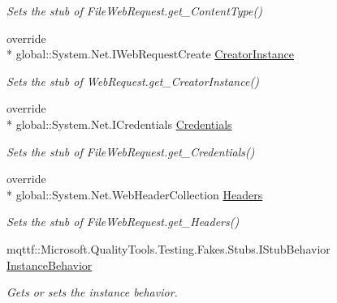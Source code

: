 \begin{DoxyCompactItemize}
\begin{DoxyCompactList}\small\item\em Sets the stub of File\-Web\-Request.\-get\-\_\-\-Content\-Type()\end{DoxyCompactList}\item 
override \\*
global\-::\-System.\-Net.\-I\-Web\-Request\-Create \hyperlink{class_system_1_1_net_1_1_fakes_1_1_stub_file_web_request_adf40d6afafbe0890830bbf7edb3ef572}{Creator\-Instance}
\begin{DoxyCompactList}\small\item\em Sets the stub of Web\-Request.\-get\-\_\-\-Creator\-Instance()\end{DoxyCompactList}\item 
override \\*
global\-::\-System.\-Net.\-I\-Credentials \hyperlink{class_system_1_1_net_1_1_fakes_1_1_stub_file_web_request_ae664d2650bd467b3d6d48be892d9295c}{Credentials}
\begin{DoxyCompactList}\small\item\em Sets the stub of File\-Web\-Request.\-get\-\_\-\-Credentials()\end{DoxyCompactList}\item 
override \\*
global\-::\-System.\-Net.\-Web\-Header\-Collection \hyperlink{class_system_1_1_net_1_1_fakes_1_1_stub_file_web_request_a2d615039463bb59a12b74eae6bfd3ca8}{Headers}
\begin{DoxyCompactList}\small\item\em Sets the stub of File\-Web\-Request.\-get\-\_\-\-Headers()\end{DoxyCompactList}\item 
mqttf\-::\-Microsoft.\-Quality\-Tools.\-Testing.\-Fakes.\-Stubs.\-I\-Stub\-Behavior \hyperlink{class_system_1_1_net_1_1_fakes_1_1_stub_file_web_request_a152042b8ca827a39180a0a6ed86abf6e}{Instance\-Behavior}
\begin{DoxyCompactList}\small\item\em Gets or sets the instance behavior.\end{DoxyCompactList}\item 

\end{DoxyCompactItemize}
